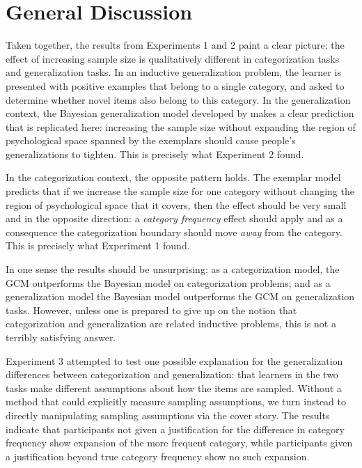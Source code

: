 \documentclass[doc,apacite]{apa6}
\begin{document}




\section{General Discussion}

Taken together, the results from Experiments 1 and 2 paint a clear picture: the effect of increasing sample size is qualitatively different in categorization tasks and generalization tasks. In an inductive generalization problem, the learner is presented with positive examples that belong to a single category, and asked to determine whether novel items also belong to this category. In the generalization context, the Bayesian generalization model developed by  makes a clear prediction that is replicated here:  increasing the sample size without expanding the region of psychological space spanned by the exemplars should cause people's generalizations to tighten. This is precisely what Experiment 2 found.

In the categorization context, the opposite pattern holds. The exemplar model predicts that if we increase the sample size for one category without changing the region of psychological space that it covers, then the effect should be very small and in the opposite direction: a {\it category frequency} effect should apply and as a consequence the categorization boundary should move {\it away} from the category. This is precisely what Experiment 1 found.

In one sense the results should be unsurprising: as a categorization model, the GCM outperforms the Bayesian model on categorization problems; and as a generalization model the Bayesian model outperforms the GCM on generalization tasks. However, unless one is prepared to give up on the notion that categorization and generalization are related inductive problems, this is not a terribly satisfying answer.

Experiment 3 attempted to test one possible explanation for the generalization differences between categorization and generalization: that learners in the two tasks make different assumptions about how the items are sampled. Without a method that could explicitly measure sampling assumptions, we turn instead to directly manipulating sampling assumptions via the cover story. The results indicate that participants not given a justification for the difference in category frequency show expansion of the more frequent category, while participants given a justification beyond true category frequency show no such expansion.
\end{document}
